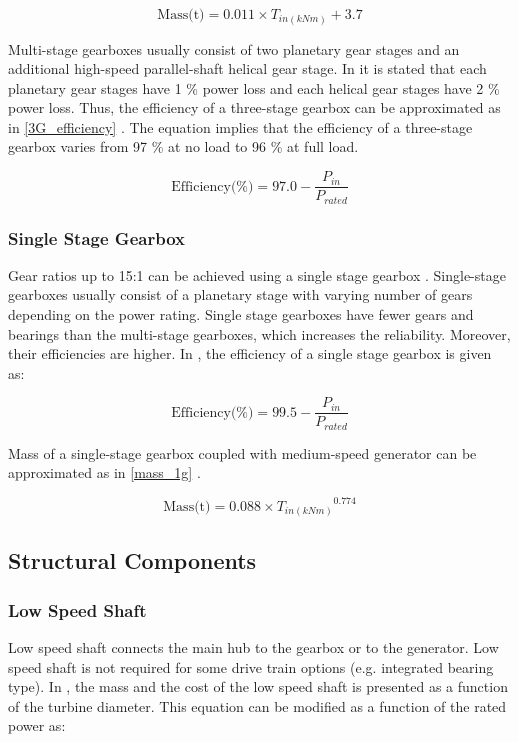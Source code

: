 \documentclass{article}\usepackage{graphicx, color}
\begin{document}
\begin{equation}
\text{Mass(t)} = 0.011 \times T_{in(kNm)} + 3.7
\label{3G_gearbox}
\end{equation}

Multi-stage gearboxes usually consist of two planetary gear stages and an additional high-speed parallel-shaft helical gear stage. In \cite{Hau2005a} it is stated that each planetary gear stages have 1 \% power loss and each helical gear stages have 2 \% power loss. Thus, the efficiency of a three-stage gearbox can be approximated as in \autoref{3G_efficiency} \cite{Zhang2011a}. The equation implies that the efficiency of a three-stage gearbox varies from 97 \% at no load to 96 \% at full load.

\begin{equation}
  \text{Efficiency(\%)} = 97.0 - \dfrac{P_{in}}{P_{rated}}
  \label{3G_efficiency}
\end{equation}

\subsubsection{Single Stage Gearbox}

Gear ratios up to 15:1 can be achieved using a single stage gearbox \cite{Cotrell2002}. Single-stage gearboxes usually consist of a planetary stage with varying number of gears depending on the power rating. Single stage gearboxes have fewer gears and bearings than the multi-stage gearboxes, which increases the reliability. Moreover, their efficiencies are higher. In \cite{Matveev2011}, the efficiency of a single stage gearbox is given as:

\begin{equation}
  \text{Efficiency(\%)} = 99.5 - \dfrac{P_{in}}{P_{rated}}
\end{equation}

Mass of a single-stage gearbox coupled with medium-speed generator can be approximated as in \autoref{mass_1g}  \cite{Fingersh2006}. 

\begin{equation}
	\text{Mass(t)} = 0.088 \times {T_{in(kNm)}}^{0.774}
  \label{mass_1g}
\end{equation}


\subsection{Structural Components}

\subsubsection{Low Speed Shaft}
Low speed shaft connects the main hub to the gearbox or to the generator. Low speed shaft is not required for some drive train options (e.g. integrated bearing type). In \cite{Fingersh2006}, the mass and the cost of the low speed shaft is presented as a function of the turbine diameter. This equation can be modified as a function of the rated power as:
\end{document}
